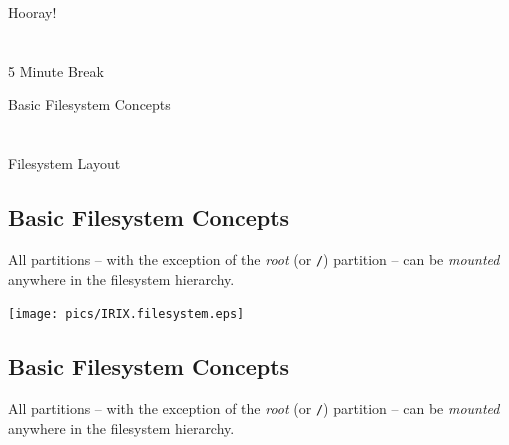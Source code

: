 \documentclass[xga]{xdvislides}
\begin{document}
\newpage
\vspace*{\fill}
\begin{center}
    \Hugesize
        Hooray! \\ [1em]
    \hspace*{5mm}
    \blueline\\
    \hspace*{5mm}\\
        5 Minute Break
\end{center}
\vspace*{\fill}

\newpage
\vspace*{\fill}
\begin{center}
	\Hugesize
		Basic Filesystem Concepts\\ [1em]
	\hspace*{5mm}
	\blueline\\
	\hspace*{5mm}\\
		Filesystem Layout
\end{center}
\vspace*{\fill}

\subsection{Basic Filesystem Concepts}
All partitions -- with the exception of the {\em root} (or \verb+/+) partition
-- can be {\em mounted} anywhere in the filesystem hierarchy.
\\

\begin{center}
\texttt{[image: pics/IRIX.filesystem.eps]} \\
\end{center}

%
%
\subsection{Basic Filesystem Concepts}
All partitions -- with the exception of the {\em root} (or \verb+/+) partition
-- can be {\em mounted} anywhere in the filesystem hierarchy.
\\
\end{document}
